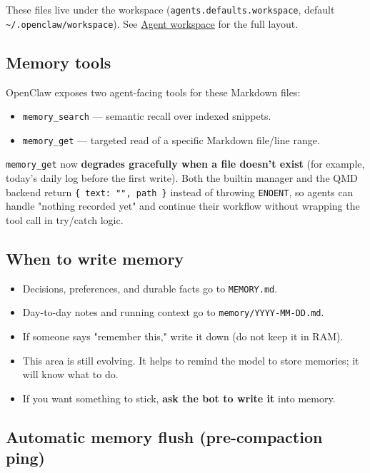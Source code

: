 These files live under the workspace (\texttt{agents.defaults.workspace}, default
\texttt{\textasciitilde{}/.openclaw/workspace}). See \href{/concepts/agent-workspace}{Agent workspace} for the full layout.

\subsection{Memory tools}


OpenClaw exposes two agent-facing tools for these Markdown files:

\begin{itemize}
  \item \texttt{memory\_search} — semantic recall over indexed snippets.
  \item \texttt{memory\_get} — targeted read of a specific Markdown file/line range.
\end{itemize}


\texttt{memory\_get} now \textbf{degrades gracefully when a file doesn't exist} (for example,
today's daily log before the first write). Both the builtin manager and the QMD
backend return \texttt{\{ text: "", path \}} instead of throwing \texttt{ENOENT}, so agents can
handle "nothing recorded yet" and continue their workflow without wrapping the
tool call in try/catch logic.

\subsection{When to write memory}


\begin{itemize}
  \item Decisions, preferences, and durable facts go to \texttt{MEMORY.md}.
  \item Day-to-day notes and running context go to \texttt{memory/YYYY-MM-DD.md}.
  \item If someone says "remember this," write it down (do not keep it in RAM).
  \item This area is still evolving. It helps to remind the model to store memories; it will know what to do.
  \item If you want something to stick, \textbf{ask the bot to write it} into memory.
\end{itemize}


\subsection{Automatic memory flush (pre-compaction ping)}


